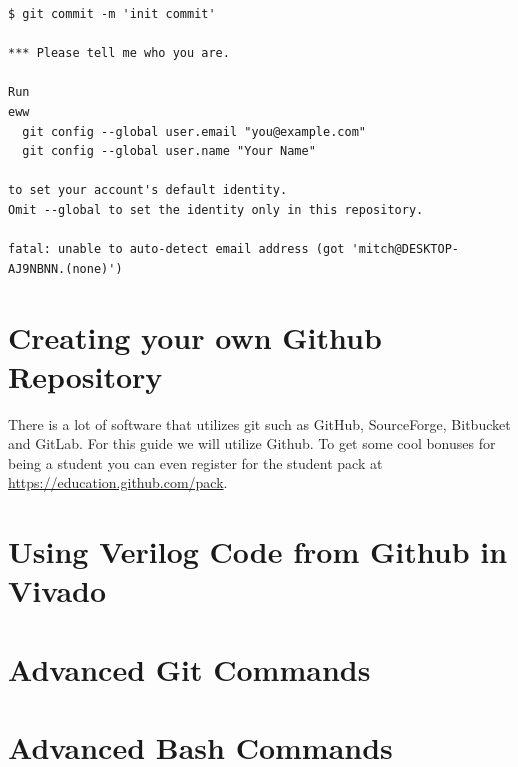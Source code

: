 \documentclass[12pt]{article}
\begin{document}
\begin{verbatim}
$ git commit -m 'init commit'

*** Please tell me who you are.

Run
eww
  git config --global user.email "you@example.com"
  git config --global user.name "Your Name"

to set your account's default identity.
Omit --global to set the identity only in this repository.

fatal: unable to auto-detect email address (got 'mitch@DESKTOP-AJ9NBNN.(none)')
\end{verbatim}

\clearpage
\section{Creating your own Github Repository}
There is a lot of software that utilizes git such as GitHub, SourceForge, Bitbucket and GitLab. For this guide we will utilize Github. To get some cool bonuses for being a student you can even register for the student pack at \href{https://education.github.com/pack}{https://education.github.com/pack}.





\section{Using Verilog Code from Github in Vivado}

\clearpage
\section{Advanced Git Commands}


\section{Advanced Bash Commands}
\end{document}
